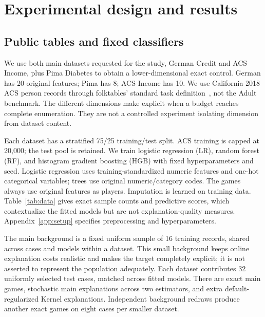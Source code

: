 \section{Experimental design and results}
\label{sec:experiments}
\subsection{Public tables and fixed classifiers}
We use both main datasets requested for the study, German Credit and ACS Income, plus Pima Diabetes to obtain a lower-dimensional exact control. German has 20 original features; Pima has 8; ACS Income has 10. We use California 2018 ACS person records through folktables' standard task definition~\citep{ding2021}, not the Adult benchmark. The different dimensions make explicit when a budget reaches complete enumeration. They are not a controlled experiment isolating dimension from dataset content.

Each dataset has a stratified 75/25 training/test split. ACS training is capped at 20,000; the test pool is retained. We train logistic regression (LR), random forest (RF), and histogram gradient boosting (HGB) with fixed hyperparameters and seed. Logistic regression uses training-standardized numeric features and one-hot categorical variables; trees use original numeric/category codes. The games always use original features as players. Imputation is learned on training data. Table~\ref{tab:data} gives exact sample counts and predictive scores, which contextualize the fitted models but are not explanation-quality measures. Appendix~\ref{app:setup} specifies preprocessing and hyperparameters.

\begin{table}[t]
\centering\small

\caption{Datasets after task filtering, training/test sizes and fixed-model predictive performance. LR/RF/HGB entries follow that order. ACS is unweighted California 2018 ACSIncome; its capped training sample does not change the test size.}
\label{tab:data}
\end{table}

The main background is a fixed uniform sample of 16 training records, shared across cases and models within a dataset. This small background keeps online explanation costs realistic and makes the target completely explicit; it is not asserted to represent the population adequately. Each dataset contributes 32 uniformly selected test cases, matched across fitted models. There are \GameCount{} exact main games, \MainRuns{} stochastic main explanations across two estimators, and \DefaultRuns{} extra default-regularized Kernel explanations. Independent background redraws produce another \BackgroundGameCount{} exact games on eight cases per smaller dataset.


